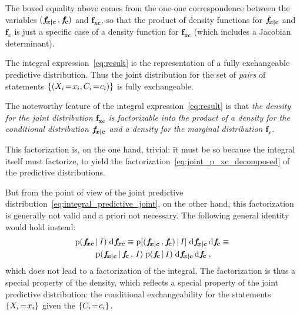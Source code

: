 \documentclass[\ifafour a4paper,12pt,\else a5paper,10pt,\fi%
onecolumn,oneside,article,%
british%
]{memoir}
\theoremstyle{remark}
\theoremstyle{innote}
\newcommand*{\di}{\mathrm{d}}%
\DeclarePairedDelimiter\set{\{}{\}}
\newcommand*{\pf}{\mathrm{p}}%
\renewcommand*{\|}[1][]{\nonscript\,#1\vert\nonscript\,\mathopen{}}
\renewcommand*{\=}{\TextOrMath\texteq\eq}
\newcommand*{\X}[1]{X_{#1}}
\newcommand*{\x}[1]{x_{#1}}
\newcommand*{\C}[1]{C_{#1}}
\newcommand*{\cc}[1]{c_{#1}}
\newcommand*{\fxc}{\bm{f_{\!x\bcond c}}}
\newcommand*{\fc}{\bm{f_{\!c}}}
\newcommand*{\fj}{\bm{f_{\!xc}}}
\newcommand*{\bcond}[1][]{\nonscript\,#1\bm{\vert}\nonscript\;\mathopen{}}
\begin{document}
The boxed equality above comes from the one-one correspondence between the
variables $(\fxc \,,\fc)$ and $\fj$, so that the product of density
functions for $\fxc$ and $\fc$ is just a specific case of a density
function for $\fj$ (which includes a Jacobian determinant).



The integral expression~\eqref{eq:result} is the representation of a fully
exchangeable predictive distribution. Thus the joint distribution for the
set of \emph{pairs} of statements $\set{(\X{i}\=\x{i}, \C{i}\=\cc{i})}$ is
fully exchangeable.

The noteworthy feature of the integral expression~\eqref{eq:result} is that
\emph{the density for the joint distribution $\fj$ is factorizable into the
  product of a density for the conditional distribution $\fxc$ and a
  density for the marginal distribution $\fc$}.

This factorization is, on the one hand, trivial: it must be so because the
integral itself must factorize, to yield the
factorization~\eqref{eq:joint_p_xc_decomposed} of the predictive
distributions.

But from the point of view of the joint predictive
distribution~\eqref{eq:integral_predictive_joint}, on the other hand, this
factorization is generally not valid and a priori not necessary. The
following general identity would hold instead:
\begin{multline}
  \label{eq:identities_factor}
  \pf(\fj\|I)\;\di\fj \equiv
  \pf[(\fxc \,,\fc) \| I] \;\di\fxc\,\di\fc
  \equiv{}\\
  \pf(\fxc \| \fc\,,\, I)  \;
  \pf(\fc \| I) \;\di\fxc\,\di\fc \;,
\end{multline}
which does not lead to a factorization of the integral.
The factorization is thus a special property of the density, which reflects
a special property of the joint predictive distribution: the conditional
exchangeability for the statements $\set{\X{i}\=\x{i}}$ given the
$\set{\C{i}\=\cc{i}}$.

\end{document}
